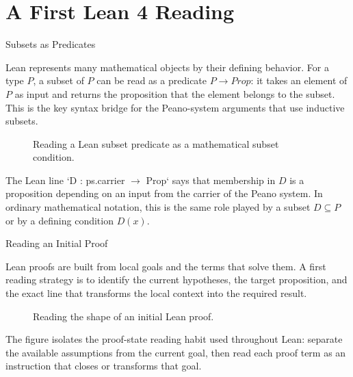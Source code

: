 \section{A First Lean 4 Reading}
\label{sec:lean-4-first-reading}

\begin{topicbox}{Subsets as Predicates}
\begin{exposition}
Lean represents many mathematical objects by their defining behavior. For a
type $P$, a subset of $P$ can be read as a predicate $P\to Prop$: it takes an
element of $P$ as input and returns the proposition that the element belongs to
the subset. This is the key syntax bridge for the Peano-system arguments that
use inductive subsets.
\end{exposition}

\begin{figure}[H]
\centering
\resizebox{\textwidth}{!}{%

}
\caption{Reading a Lean subset predicate as a mathematical subset condition.}
\label{fig:lean-function-syntax}
\end{figure}

\begin{remark*}[Interpretation]
The Lean line `D : ps.carrier \(\to\) Prop` says that membership in $D$ is a
proposition depending on an input from the carrier of the Peano system. In
ordinary mathematical notation, this is the same role played by a subset
$D\subseteq P$ or by a defining condition $D(x)$.
\end{remark*}
\end{topicbox}

\begin{topicbox}{Reading an Initial Proof}
\begin{exposition}
Lean proofs are built from local goals and the terms that solve them. A first
reading strategy is to identify the current hypotheses, the target proposition,
and the exact line that transforms the local context into the required result.
\end{exposition}

\begin{figure}[H]
\centering
\resizebox{\textwidth}{!}{%

}
\caption{Reading the shape of an initial Lean proof.}
\label{fig:lean-initial-proof}
\end{figure}

\begin{remark*}[Interpretation]
The figure isolates the proof-state reading habit used throughout Lean:
separate the available assumptions from the current goal, then read each proof
term as an instruction that closes or transforms that goal.
\end{remark*}
\end{topicbox}
